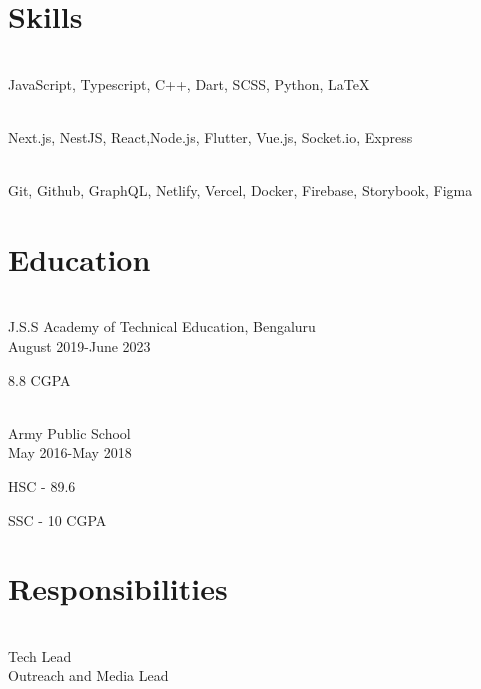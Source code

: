 \documentclass[]{plushcv}
\begin{document}
\begin{minipage}[t]{0.25\textwidth} 


\section{Skills}
\\[3pt]
JavaScript, Typescript, C++, Dart, SCSS, Python, \LaTeX\
\sectionbottomsep

\\[3pt]
Next.js, NestJS, React,Node.js, Flutter, Vue.js, Socket.io, Express
\sectionbottomsep

\\[3pt]
Git, Github, GraphQL, Netlify, Vercel, Docker, Firebase, \mbox{Storybook}, Figma
\sectionbottomsep




\section{Education} 
\\[3pt]
J.S.S Academy of Technical Education, Bengaluru\\
August 2019-June 2023
\begin{tightemize}
\item 8.8 CGPA 
\end{tightemize}
\sectionbottomsep

\\[3pt]
Army Public School\\
May 2016-May 2018
\begin{tightemize}
\item HSC - 89.6%
\item SSC - 10 CGPA
\end{tightemize}




\section{Responsibilities} 
\\[3pt]
Tech Lead\\
Outreach and Media Lead




\end{minipage}
\end{document}
